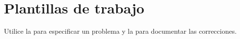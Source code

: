 \chapter{Plantillas de trabajo}\label{anexo:plantillas}

Utilice la  para especificar un problema y la  para documentar las correcciones.




